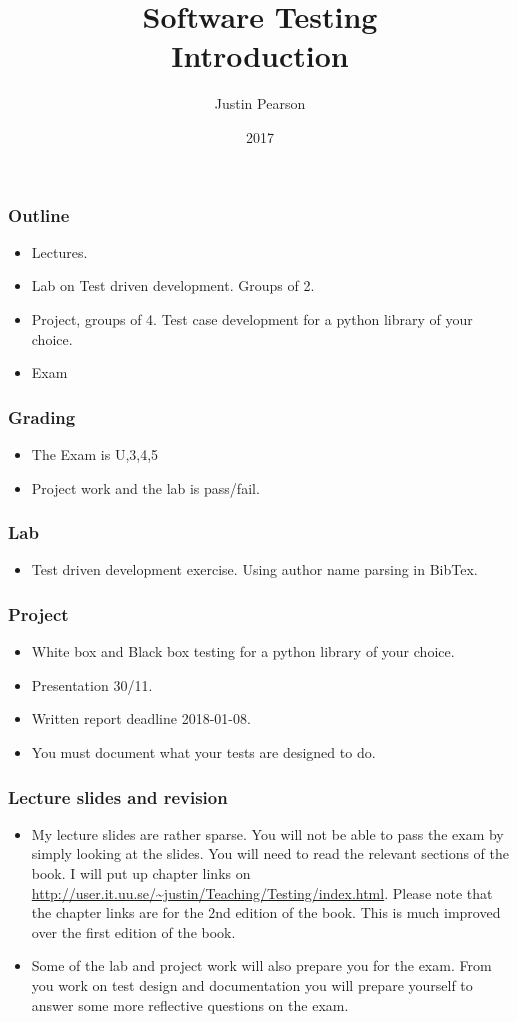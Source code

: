\documentclass{beamer}
\title{Software Testing \\ Introduction}
\author{Justin Pearson}
\date{2017}
\begin{document}
\lstset{language=python}

\begin{frame}
  \maketitle
\end{frame}
\begin{frame}
  \frametitle{Outline}
  \begin{itemize}
  \item Lectures.
  \item Lab on Test driven development. Groups of 2.
  \item Project, groups of 4. Test case development for a python
    library of your choice.
  \item Exam
  \end{itemize}
\end{frame}
\begin{frame}
  \frametitle{Grading}
  \begin{itemize}
  \item The Exam is U,3,4,5
  \item Project work and the lab is pass/fail.
  \end{itemize}
\end{frame}
\begin{frame}
  \frametitle{Lab}
  \begin{itemize}
  \item Test driven development exercise. Using author name parsing in
    BibTex. 
  \end{itemize}
\end{frame}
\begin{frame}
  \frametitle{Project}
  \begin{itemize}
  \item White box and Black box testing for a python library of your choice.
  \item Presentation 30/11.
  \item Written report deadline 2018-01-08.
  \item You must document what your tests are designed to do.
  \end{itemize}
\end{frame}
\begin{frame}
  \frametitle{Lecture slides and revision}
  \begin{itemize}
  \item   My lecture slides are rather sparse. You will not be able to pass
  the exam by simply looking at the slides. You will need to read the
  relevant sections of the book. I will put up chapter links on
  \url{http://user.it.uu.se/~justin/Teaching/Testing/index.html}. Please note
  that the chapter links are for the 2nd edition of the book. This is much
  improved over the first edition of the book. 
\item Some of the lab and project work will also prepare you for the
  exam. From you work on test design and documentation you will
  prepare yourself to answer some more reflective questions on the exam.
  \end{itemize}
\end{frame}
\end{document}
